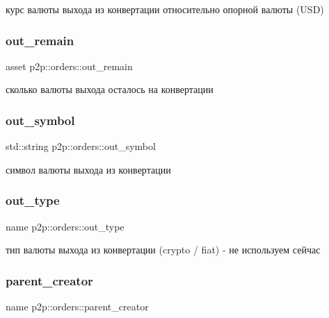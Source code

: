 курс валюты выхода из конвертации относительно опорной валюты (U\+SD) \mbox{\label{structp2p_1_1orders_ad375146e4c5f03d42250be97b8d43cde}} 
\subsubsection{\texorpdfstring{out\+\_\+remain}{out\_remain}}
{\footnotesize\ttfamily asset p2p\+::orders\+::out\+\_\+remain}

сколько валюты выхода осталось на конвертации \mbox{\label{structp2p_1_1orders_a726223d82cdc43e2b734cf673835c582}} 
\subsubsection{\texorpdfstring{out\+\_\+symbol}{out\_symbol}}
{\footnotesize\ttfamily std\+::string p2p\+::orders\+::out\+\_\+symbol}

символ валюты выхода из конвертации \mbox{\label{structp2p_1_1orders_ad8c0bf06458e15a53a06e404e2e2130d}} 
\subsubsection{\texorpdfstring{out\+\_\+type}{out\_type}}
{\footnotesize\ttfamily name p2p\+::orders\+::out\+\_\+type}

тип валюты выхода из конвертации (crypto / fiat) -\/ не используем сейчас \mbox{\label{structp2p_1_1orders_aec4e15d60ed528fd396443cf448197aa}} 
\subsubsection{\texorpdfstring{parent\+\_\+creator}{parent\_creator}}
{\footnotesize\ttfamily name p2p\+::orders\+::parent\+\_\+creator}

